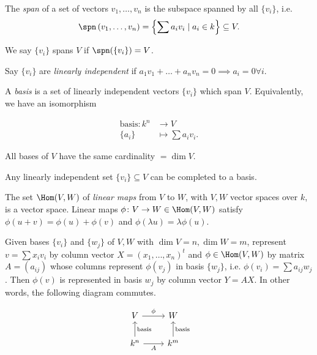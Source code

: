 \documentclass{notes}
\begin{document}
\begin{defn}
    The \emph{span} of a set of vectors ${v}_{1},\ldots,{v}_{n}$ is the subspace spanned by all $\{v_i\}$, i.e.
    \[
        \spn\left( {v}_{1},\ldots,{v}_{n} \right) =\left\{\sum a_iv_i \mid a_i\in k \right\} \subseteq V
    .\] 

    We say $\{v_i\}$ spans $V$ if $\spn(\{v_i\})=V$.
\end{defn}

\begin{defn}
    Say $\{v_i\} $ are \emph{linearly independent} if $a_1v_1+\ldots+a_nv_n=0\implies a_i=0 \forall i$.
\end{defn}

\begin{defn}
    A \emph{basis} is a set of linearly independent vectors $\{v_i\} $ which span $V$. Equivalently, we have an isomorphism
    
    \begin{align*}
        \text{basis}\colon k^n  &\longrightarrow V \\
        \{a_i\}  &\longmapsto \sum a_iv_i
    .\end{align*} 
\end{defn}

\begin{theorem}
    All bases of $V$ have the same cardinality $=\dim V$.
\end{theorem}

\begin{corollary}
    Any linearly independent set $\{v_i\}\subseteq V $ can be completed to a basis.
\end{corollary}

\begin{defn}
    The set $\Hom(V,W)$ of \emph{linear maps} from $V$ to $W$, with $V,W$ vector spaces over $k$, is a vector space. Linear maps $\phi \colon V \to W\in \Hom(V,W)$ satisfy $\phi \left( u+v \right) =\phi (u)+\phi (v)$ and $\phi (\lambda u)=\lambda \phi (u)$.  
\end{defn}

\begin{theorem}[Matrices]
    Given bases $\{v_i\}$ and $\{w_j\}$ of $V,W$ with $\dim V=n, \dim W=m$, represent $v=\sum x_iv_i$ by column vector $X=({x}_{1},\ldots,{x}_{n})^{t}$ and $\phi \in \Hom(V,W)$ by matrix $A=(a_{ij})$ whose columns represent $\phi (v_j)$ in basis $\{w_j\}$, i.e. $\phi (v_i)=\sum a_{ij}w_j$. Then $\phi (v)$ is represented in basis $w_j$ by column vector $Y=AX$. In other words, the following diagram commutes.

\[\begin{tikzcd}
	V & W \\
	{k^n} & {k^m}
	\arrow["\phi", from=1-1, to=1-2]
	\arrow["{\text{basis}}"', from=2-2, to=1-2]
	\arrow["{\text{basis}}"', from=2-1, to=1-1]
	\arrow["A"', from=2-1, to=2-2]
\end{tikzcd}\]
\end{theorem}
\end{document}
